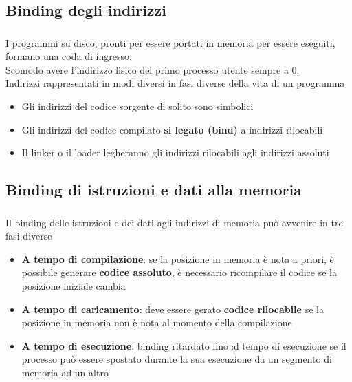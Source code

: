 \documentclass{beamer}
\newenvironment{mainframe}{
	\begin{frame}
		\frametitle{\insertsubsection}
		\framesubtitle{\insertsection}
	}{
	\end{frame}
}
\begin{document}
\subsection{Binding degli indirizzi}
\begin{mainframe}
	I programmi su disco, pronti per essere portati in memoria per essere eseguiti, formano una coda di ingresso.\\
	Scomodo avere l'indirizzo fisico del primo processo utente sempre a 0.\\
	Indirizzi rappresentati in modi diversi in fasi diverse della vita di un programma
	\begin{itemize}
		\item Gli indirizzi del codice sorgente di solito sono simbolici
		\item Gli indirizzi del codice compilato \textbf{si legato (bind)} a indirizzi rilocabili
		\item Il linker o il loader legheranno gli indirizzi rilocabili agli indirizzi assoluti
	\end{itemize}
\end{mainframe}
\subsection{Binding di istruzioni e dati alla memoria}
\begin{mainframe}
	Il binding delle istruzioni e dei dati agli indirizzi di memoria può avvenire in tre fasi diverse
	\begin{itemize}
		\item \textbf{A tempo di compilazione}: se la posizione in memoria è nota a priori, è possibile generare \textbf{codice assoluto}, è necessario ricompilare il codice se la posizione iniziale cambia
		\item \textbf{A tempo di caricamento}: deve essere gerato \textbf{codice rilocabile} se la posizione in memoria non è nota al momento della compilazione
		\item \textbf{A tempo di esecuzione}: binding ritardato fino al tempo di esecuzione se il processo può essere spostato durante la sua esecuzione da un segmento di memoria ad un altro
	\end{itemize}
\end{mainframe}
\end{document}
